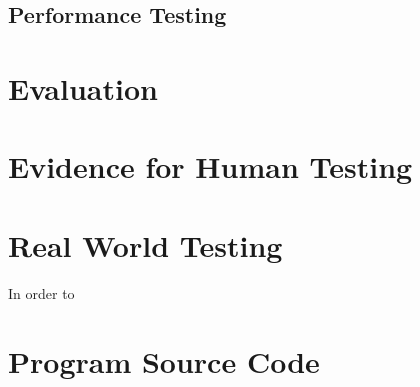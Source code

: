 \documentclass[11pt,twoside,a4paper]{report}
\begin{document}
\section{Performance Testing}
\chapter{Evaluation}
\newpage
\appendix
\appendixpage
\addappheadtotoc
\chapter{Evidence for Human Testing}
\chapter{Real World Testing}
\label{Real World Testing}
In order to  
\chapter{Program Source Code}
\newpage
{}
\printbibliography
\label{end}
\end{document}
